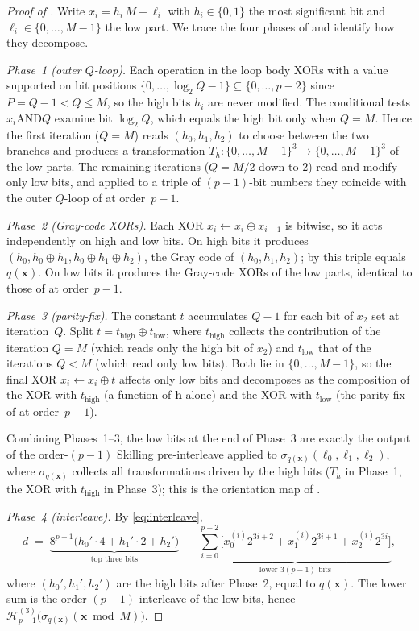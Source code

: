 \documentclass[11pt,a4paper]{article}
\theoremstyle{plain}
\theoremstyle{definition}
\theoremstyle{remark}
\newcommand{\Hil}{\mathcal{H}}
\begin{document}
\begin{proof}[Proof of ]
Write $x_i = h_i\,M + \ell_i$ with $h_i\in\{0,1\}$ the most significant
bit and $\ell_i\in\{0,\dots,M-1\}$ the low part. We trace the four
phases of  and identify how they decompose.

\emph{Phase~1 (outer $Q$-loop).} Each operation in the loop body XORs
with a value supported on bit positions $\{0,\dots,\log_2 Q - 1\}
\subseteq\{0,\dots,p-2\}$ since $P=Q-1<Q\leq M$, so the high bits
$h_i$ are never modified. The conditional tests
$x_i\mathbin{\mathrm{AND}} Q$ examine bit $\log_2 Q$, which equals the
high bit only when $Q=M$. Hence the first iteration ($Q=M$) reads
$(h_0,h_1,h_2)$ to choose between the two branches and produces a
transformation $T_h:\{0,\dots,M-1\}^3\to\{0,\dots,M-1\}^3$ of the low
parts. The remaining iterations ($Q = M/2$ down to $2$) read and modify
only low bits, and applied to a triple of $(p-1)$-bit numbers they
coincide with the outer $Q$-loop of  at
order~$p-1$.

\emph{Phase~2 (Gray-code XORs).} Each XOR $x_i\gets x_i\oplus x_{i-1}$
is bitwise, so it acts independently on high and low bits. On high bits
it produces $(h_0,h_0\oplus h_1,h_0\oplus h_1\oplus h_2)$, the Gray
code of $(h_0,h_1,h_2)$; by  this triple equals
$q(\mathbf{x})$. On low bits it produces the Gray-code XORs of the low
parts, identical to those of  at order~$p-1$.

\emph{Phase~3 (parity-fix).} The constant $t$ accumulates $Q-1$ for
each bit of $x_2$ set at iteration~$Q$. Split
$t = t_{\mathrm{high}}\oplus t_{\mathrm{low}}$, where
$t_{\mathrm{high}}$ collects the contribution of the iteration $Q=M$
(which reads only the high bit of $x_2$) and $t_{\mathrm{low}}$ that of
the iterations $Q<M$ (which read only low bits). Both lie in
$\{0,\dots,M-1\}$, so the final XOR $x_i\gets x_i\oplus t$ affects only
low bits and decomposes as the composition of the XOR with
$t_{\mathrm{high}}$ (a function of $\mathbf{h}$ alone) and the XOR with
$t_{\mathrm{low}}$ (the parity-fix of  at
order~$p-1$).

Combining Phases~1--3, the low bits at the end of Phase~3 are exactly
the output of the order-$(p-1)$ Skilling pre-interleave applied to
$\sigma_{q(\mathbf{x})}(\ell_0,\ell_1,\ell_2)$, where $\sigma_{q(\mathbf{x})}$
collects all transformations driven by the high bits ($T_h$ in
Phase~1, the XOR with $t_{\mathrm{high}}$ in Phase~3); this is the
orientation map of .

\emph{Phase~4 (interleave).} By \eqref{eq:interleave},
\[
d \;=\;
\underbrace{8^{p-1}\bigl(h_0'\cdot 4 + h_1'\cdot 2 + h_2'\bigr)}_{\text{top three bits}}
\;+\;
\underbrace{\sum_{i=0}^{p-2}\bigl[x_0^{(i)}2^{3i+2}+x_1^{(i)}2^{3i+1}+x_2^{(i)}2^{3i}\bigr]}_{\text{lower }3(p-1)\text{ bits}},
\]
where $(h_0',h_1',h_2')$ are the high bits after Phase~2, equal to
$q(\mathbf{x})$. The lower sum is the order-$(p-1)$ interleave of the
low bits, hence
$\Hil_{p-1}^{(3)}\bigl(\sigma_{q(\mathbf{x})}(\mathbf{x}\bmod M)\bigr)$.
\end{proof}
\end{document}
